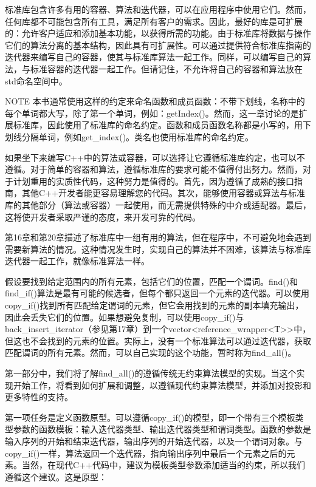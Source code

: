 
标准库包含许多有用的容器、算法和迭代器，可以在应用程序中使用它们。然而，任何库都不可能包含所有工具，满足所有客户的需求。因此，最好的库是可扩展的：允许客户适应和添加基本功能，以获得所需的功能。由于标准库将数据与操作它们的算法分离的基本结构，因此具有可扩展性。可以通过提供符合标准库指南的迭代器来编写自己的容器，使其与标准库算法一起工作。同样，可以编写自己的算法，与标准容器的迭代器一起工作。但请记住，不允许将自己的容器和算法放在std命名空间中。

\begin{myNotic}{NOTE}
本书通常使用这样的约定来命名函数和成员函数：不带下划线，名称中的每个单词都大写，除了第一个单词，例如：getIndex()。然而，这一章讨论的是扩展标准库，因此使用了标准库的命名约定。函数和成员函数名称都是小写的，用下划线分隔单词，例如get\_index()。类名也使用标准库的命名约定。
\end{myNotic}


如果坐下来编写C++中的算法或容器，可以选择让它遵循标准库约定，也可以不遵循。对于简单的容器和算法，遵循标准库的要求可能不值得付出努力。然而，对于计划重用的实质性代码，这种努力是值得的。首先，因为遵循了成熟的接口指南，其他C++开发者能更容易理解您的代码。其次，能够使用容器或算法与标准库的其他部分（算法或容器）一起使用，而无需提供特殊的中介或适配器。最后，这将使开发者采取严谨的态度，来开发可靠的代码。


第16章和第20章描述了标准库中一组有用的算法，但在程序中，不可避免地会遇到需要新算法的情况。这种情况发生时，实现自己的算法并不困难，该算法与标准库迭代器一起工作，就像标准算法一样。


假设要找到给定范围内的所有元素，包括它们的位置，匹配一个谓词。find()和find\_if()算法是最有可能的候选者，但每个都只返回一个元素的迭代器。可以使用copy\_if()找到所有匹配给定谓词的元素，但它会用找到的元素的副本填充输出，因此会丢失它们的位置。如果想避免复制，可以使用copy\_if()与back\_insert\_iterator（参见第17章）到一个vector<reference\_wrapper<T>{}>中，但这也不会找到的元素的位置。实际上，没有一个标准算法可以通过迭代器，获取匹配谓词的所有元素。然而，可以自己实现的这个功能，暂时称为find\_all()。

第一部分中，我们将了解find\_all()的遵循传统无约束算法模型的实现。当这个实现开始工作，将看到如何扩展和调整，以遵循现代约束算法模型，并添加对投影和更多特性的支持。

第一项任务是定义函数原型。可以遵循copy\_if()的模型，即一个带有三个模板类型参数的函数模板：输入迭代器类型、输出迭代器类型和谓词类型。函数的参数是输入序列的开始和结束迭代器，输出序列的开始迭代器，以及一个谓词对象。与copy\_if()一样，算法返回一个迭代器，指向输出序列中最后一个元素之后的元素。当然，在现代C++代码中，建议为模板类型参数添加适当的约束，所以我们遵循这个建议。这是原型：

